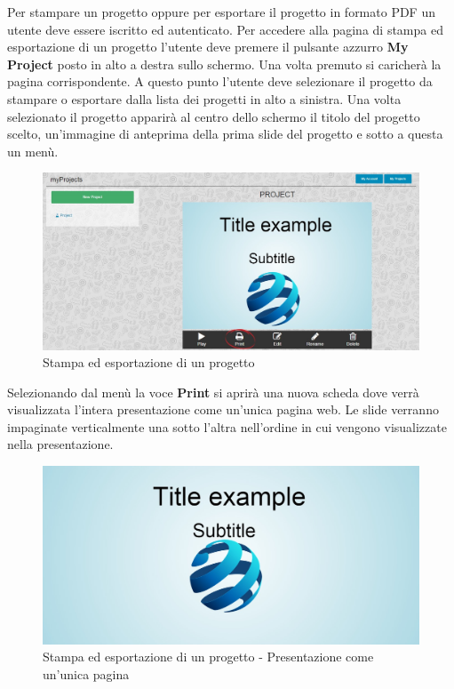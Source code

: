 Per stampare un progetto oppure per esportare il progetto in formato PDF un utente deve essere iscritto ed autenticato. Per accedere alla pagina di stampa ed esportazione di un progetto l'utente deve premere il pulsante azzurro \textbf{My Project} posto in alto a destra sullo schermo. Una volta premuto si caricherà la pagina corrispondente. A questo punto l'utente deve selezionare il progetto da stampare o esportare dalla lista dei progetti in alto a sinistra.
Una volta selezionato il progetto apparirà al centro dello schermo il titolo del progetto scelto, un'immagine di anteprima della prima slide del progetto e sotto a questa un menù. 

\begin{figure}[H] 
	\centering 
	\includegraphics[scale=0.40] {img/stampa_pro}
	\caption{Stampa ed esportazione di un progetto} 
\end{figure}

\noindent Selezionando dal menù la voce \textbf{Print} si aprirà una nuova scheda dove verrà visualizzata l'intera presentazione come un'unica pagina web. Le slide verranno impaginate verticalmente una sotto l'altra nell'ordine in cui vengono visualizzate nella presentazione.

\begin{figure}[H] 
	\centering 
	\includegraphics[scale=0.40] {img/print}
	\caption{Stampa ed esportazione di un progetto - Presentazione come un'unica pagina} 
\end{figure}

